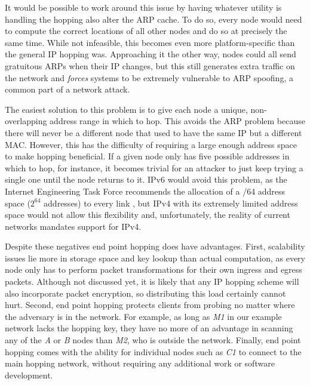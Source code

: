 \par It would be possible to work around this issue by having whatever utility is handling the hopping also alter the ARP cache. To do so, every node would need to compute the correct locations of all other nodes and do so at precisely the same time. While not infeasible, this becomes even more platform-specific than the general IP hopping was. Approaching it the other way, nodes could all send gratuitous ARPs when their IP changes, but this still generates extra traffic on the network and \textit{forces} systems to be extremely vulnerable to ARP spoofing, a common part of a network attack.

\par The easiest solution to this problem is to give each node a unique, non-overlapping address range in which to hop. This avoids the ARP problem because there will never be a different node that used to have the same IP but a different MAC. However, this has the difficulty of requiring a large enough address space to make hopping beneficial. If a given node only has five possible addresses in which to hop, for instance, it becomes trivial for an attacker to just keep trying a single one until the node returns to it. IPv6 would avoid this problem, as the Internet Engineering Task Force recommends the allocation of a /64 address space ($2^{64}$ addresses) to every link \cite{rfc3267}, but IPv4 with its extremely limited address space would not allow this flexibility and, unfortunately, the reality of current networks mandates support for IPv4. %

\par Despite these negatives end point hopping does have advantages. First, scalability issues lie more in storage space and key lookup than actual computation, as every node only has to perform packet transformations for their own ingress and egress packets. Although not discussed yet, it is likely that any IP hopping scheme will also incorporate packet encryption, so distributing this load certainly cannot hurt. Second, end point hopping protects clients from probing no matter where the adversary is in the network. For example, as long as \textit{M1} in our example network lacks the hopping key, they have no more of an advantage in scanning any of the \textit{A} or \textit{B} nodes than \textit{M2}, who is outside the network. Finally, end point hopping comes with the ability for individual nodes such as \textit{C1} to connect to the main hopping network, without requiring any additional work or software development.

